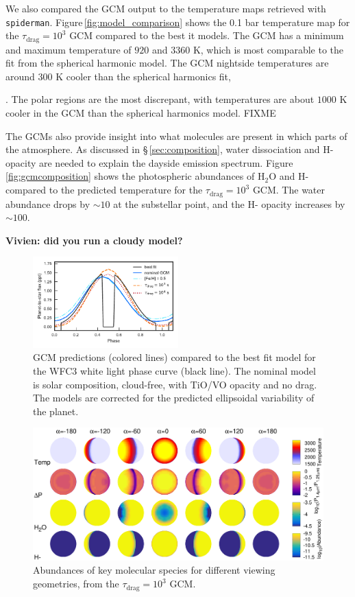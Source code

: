\documentclass[twocolumn]{aastex61}
\begin{document}
We also compared the GCM output to the temperature maps retrieved with \texttt{spiderman}. Figure\,\ref{fig:model_comparison} shows the 0.1 bar temperature map for the $\tau_\mathrm{drag} = 10^3$ GCM compared to the best it models. The GCM has a minimum and maximum temperature of $920$ and $3360$ K, which is most comparable to the fit from the spherical harmonic model.  The GCM nightside temperatures are around $300$ K cooler than the spherical harmonics fit, 

. The polar regions are the most discrepant, with temperatures are about $1000$ K cooler in the GCM than the spherical harmonics model. FIXME

The GCMs also provide insight into what molecules are present in which parts of the atmosphere. As discussed in \S\,\ref{sec:composition}, water dissociation and H- opacity are needed to explain the dayside emission spectrum. Figure\,\ref{fig:gcmcomposition} shows the photospheric abundances of H$_2$O and H- compared to the predicted temperature for the $\tau_\mathrm{drag} = 10^3$ GCM. The water abundance drops by $\sim10$ at the substellar point, and the H- opacity increases by $\sim100$. 

\textbf{Vivien: did you run a cloudy model?}

\begin{figure}
\includegraphics[width = 0.5\textwidth]{Figures/gcm_comparison.pdf}
\caption{GCM predictions (colored lines) compared to the best fit model for the WFC3 white light phase curve (black line). The nominal model is solar composition, cloud-free, with TiO/VO opacity and no drag. The models are corrected for the predicted ellipsoidal variability of the planet.}
\label{fig:gcmcomparison}
\end{figure}

\begin{figure}
	\includegraphics[width = 1.0\textwidth]{Figures/GCM_abundances.eps}
\caption{Abundances of key molecular species for different viewing geometries, from the $\tau_\mathrm{drag} = 10^3$ GCM.}
\label{fig:GCMabundance}
\end{figure}
\end{document}
